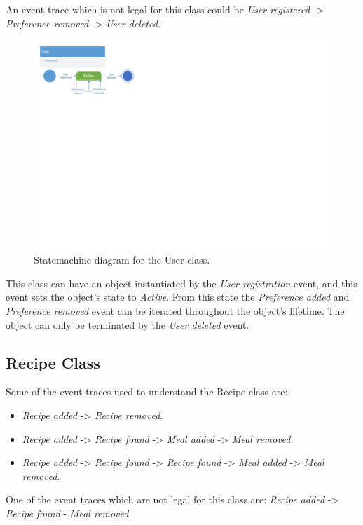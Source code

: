 An event trace which is not legal for this class could be \textit{User registered} -> \textit{Preference removed} -> \textit{User deleted}.

\begin{figure}[H]
	\centering
	\includegraphics[clip=true, trim=0 14cm 5cm 0]{Grafik/FoodPlanner/UserSettings.pdf}
	\caption{Statemachine diagram for the User class.} \label{UserSettingsClass}
\end{figure}

This class can have an object instantiated by the \textit{User registration} event, and this event sets the object's state to \textit{Active}. From this state the \textit{Preference added} and \textit{Preference removed} event can be iterated throughout the object's lifetime. The object can only be terminated by the \textit{User deleted} event.


\subsection{Recipe Class}
Some of the event traces used to understand the Recipe class are:
\begin{itemize}
	\item \textit{Recipe added} -> \textit{Recipe removed}.
	\item \textit{Recipe added} -> \textit{Recipe found} -> \textit{Meal added} -> \textit{Meal removed}.
	\item \textit{Recipe added} -> \textit{Recipe found} -> \textit{Recipe found} -> \textit{Meal added} -> \textit{Meal removed}.
\end{itemize}

One of the event traces which are not legal for this class are:\textit{ Recipe added }-> \textit{Recipe found} - \textit{Meal removed}.


